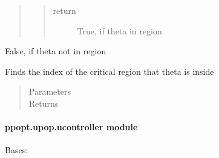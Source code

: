 \documentclass[letterpaper,10pt,english]{sphinxmanual}
\begin{document}
\begin{fulllineitems}
\begin{fulllineitems}
\begin{quote}
\begin{quote}
\begin{description}
\item[{return}] \leavevmode
\sphinxAtStartPar
True, if theta in region

\end{description}\end{quote}
\end{quote}

\sphinxAtStartPar
False, if theta not in region

\end{fulllineitems}


\begin{fulllineitems}
\label{\detokenize{ppopt.upop:ppopt.upop.point_location.PointLocation.locate}}
\sphinxAtStartPar
Finds the index of the critical region that theta is inside
\begin{quote}\begin{description}
\item[{Parameters}] \leavevmode
\sphinxAtStartPar
{} \textendash{} 

\item[{Returns}] \leavevmode
\sphinxAtStartPar


\end{description}\end{quote}

\end{fulllineitems}


\end{fulllineitems}



\paragraph{ppopt.upop.ucontroller module}
\label{\detokenize{ppopt.upop:module-ppopt.upop.ucontroller}}\label{\detokenize{ppopt.upop:ppopt-upop-ucontroller-module}}

\begin{fulllineitems}
\label{\detokenize{ppopt.upop:ppopt.upop.ucontroller.BVH}}
\sphinxAtStartPar
Bases: 

\end{fulllineitems}
\end{document}
